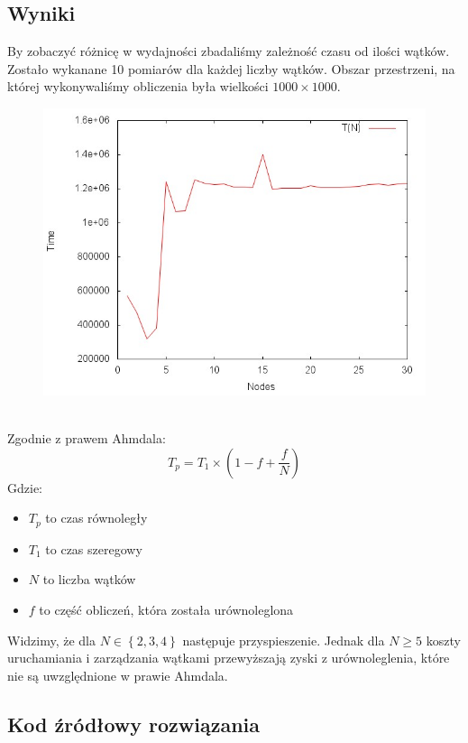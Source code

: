 \documentclass[paper=a4, fontsize=13pt]{scrartcl} %
\numberwithin{equation}{section} %
\numberwithin{figure}{section} %
\numberwithin{table}{section} %
\begin{document}
\subsection{Wyniki}
By zobaczyć różnicę w wydajności zbadaliśmy zależność czasu od ilości wątków. Zostało wykanane 10 pomiarów dla każdej liczby wątków. Obszar przestrzeni, na której wykonywaliśmy obliczenia była wielkości $1000\times1000$.
\begin{figure}[h]
\centering
\includegraphics[width=0.55\linewidth]{time}
\label{fig:time}
\end{figure}\\
Zgodnie z prawem Ahmdala:
$$T_p=T_1\times\left(1-f+\frac{f}{N} \right)$$
Gdzie:
\begin{itemize}
	\item $T_p$ to czas równoległy
	\item $T_1$ to czas szeregowy
	\item $N$ to liczba wątków
	\item $f$ to część obliczeń, która została urównoleglona
\end{itemize}
Widzimy, że dla $N\in\left\lbrace 2,3,4\right\rbrace$ następuje przyspieszenie. Jednak dla $N\geq5$ koszty uruchamiania i zarządzania wątkami przewyższają zyski z urównoleglenia, które nie są uwzględnione w prawie Ahmdala.
\subsection{Kod źródłowy rozwiązania}

\end{document}
